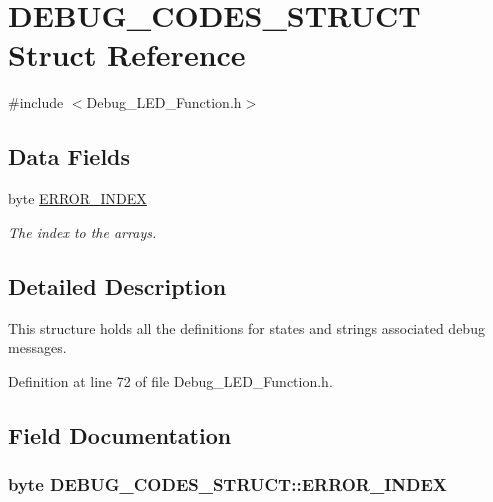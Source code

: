 \hypertarget{struct_d_e_b_u_g___c_o_d_e_s___s_t_r_u_c_t}{\section{D\-E\-B\-U\-G\-\_\-\-C\-O\-D\-E\-S\-\_\-\-S\-T\-R\-U\-C\-T Struct Reference}
\label{struct_d_e_b_u_g___c_o_d_e_s___s_t_r_u_c_t}
}


{\ttfamily \#include $<$Debug\-\_\-\-L\-E\-D\-\_\-\-Function.\-h$>$}

\subsection*{Data Fields}
\begin{DoxyCompactItemize}
\item 
byte \hyperlink{struct_d_e_b_u_g___c_o_d_e_s___s_t_r_u_c_t_ac7d42a6e8e021247820d070b12059512}{E\-R\-R\-O\-R\-\_\-\-I\-N\-D\-E\-X}
\begin{DoxyCompactList}\small\item\em The index to the arrays. \end{DoxyCompactList}\end{DoxyCompactItemize}


\subsection{Detailed Description}
This structure holds all the definitions for states and strings associated debug messages. 

Definition at line 72 of file Debug\-\_\-\-L\-E\-D\-\_\-\-Function.\-h.



\subsection{Field Documentation}
\hypertarget{struct_d_e_b_u_g___c_o_d_e_s___s_t_r_u_c_t_ac7d42a6e8e021247820d070b12059512}{
\subsubsection[{E\-R\-R\-O\-R\-\_\-\-I\-N\-D\-E\-X}]{\setlength{\rightskip}{0pt plus 5cm}byte D\-E\-B\-U\-G\-\_\-\-C\-O\-D\-E\-S\-\_\-\-S\-T\-R\-U\-C\-T\-::\-E\-R\-R\-O\-R\-\_\-\-I\-N\-D\-E\-X}}\label{struct_d_e_b_u_g___c_o_d_e_s___s_t_r_u_c_t_ac7d42a6e8e021247820d070b12059512}


